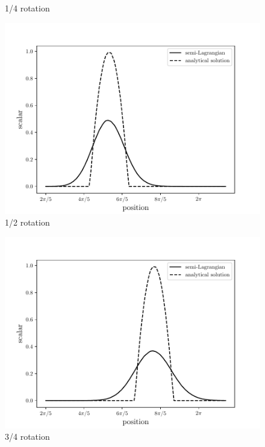 \begin{frame}
\begin{center}
\begin{figure}[H]
\begin{minipage}{.5\linewidth}
      \tiny 1/4 rotation
     \end{minipage}
     \begin{minipage}{.5\linewidth}
      \centering
      \includegraphics[scale=0.33]{./images/SLlinear2.pdf}\\
      \tiny 1/2 rotation
     \end{minipage}%
     \begin{minipage}{.5\linewidth}
      \centering
      \includegraphics[scale=0.33]{./images/SLlinear3.pdf}\\
      \tiny 3/4 rotation
     \end{minipage}
\end{figure}
\end{center}
\end{frame} 





